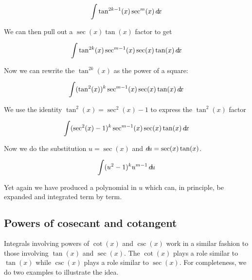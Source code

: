 \documentclass{ximera}
\begin{document}
\[
\int \tan^{2k-1}(x) \sec^{m}(x) \mathop{}\!d\! x
\]


We can then pull out a $\sec(x)\tan(x)$ factor to get 

\[
\int \tan^{2k}(x) \sec^{m-1}(x) \sec(x)\tan(x) \mathop{}\!d\! x
\]

Now we can rewrite the $\tan^{2k}(x)$ as the power of a square:

\[
\int (\tan^{2}(x))^{k} \sec^{m-1}(x) \sec(x)\tan(x) \mathop{}\!d\! x
\]

We use the identity $\tan^{2}(x)=\sec^{2}(x)-1$ to express the $\tan^{2}(x)$ factor

\[
\int (\sec^{2}(x)-1)^{k} \sec^{m-1}(x) \sec(x)\tan(x) \mathop{}\!d\! x
\]

Now we do the substitution $u=\sec(x)$ and $\mathop{}\!d\! u=\sec(x)\tan(x)$. 

\[
\int (u^{2}-1)^{k} u^{m-1} \mathop{}\!d\! u
\]

Yet again we have produced a polynomial in $u$ which can, in principle, be expanded and integrated term by term. 


\subsection{Powers of cosecant and cotangent}

Integrals involving powers of $\cot(x)$ and $\csc(x)$ work in a similar fashion to those involving $\tan(x)$ and $\sec(x)$. The $\cot(x)$ 
plays a role similar to $\tan(x)$ while $\csc(x)$ plays a role similar to $\sec(x)$. For completeness, we do two examples to illustrate the idea.
\end{document}
